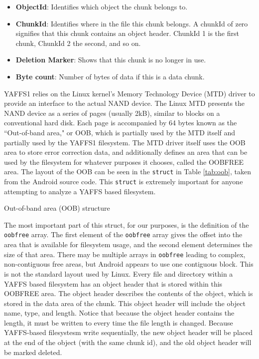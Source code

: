 \begin{itemize}
	\item {\bf ObjectId}: Identifies which object the chunk belongs to.\
	\item {\bf ChunkId}: Identifies where in the file this chunk belongs. 
		A chunkId of zero signifies that this chunk contains an object header. 
		ChunkId 1 is the first chunk, ChunkId 2 the second, and so on.
	\item {\bf Deletion Marker}: Shows that this chunk is no longer in use.
	\item {\bf Byte count}: Number of bytes of data if this is a data chunk.
\end{itemize}
\cite{howyaffsworks}

YAFFS1 relies on the Linux kernel's Memory Technology Device (MTD) driver to provide an interface to the actual NAND device.  The
Linux MTD presents the NAND device as a series of pages (usually 2kB), similar to blocks on a conventional hard disk.  Each page is
accompanied by 64 bytes known as the ``Out-of-band area," or OOB, which is partially used by the MTD itself and partially used by
the YAFFS1 filesystem. The MTD driver itself uses the OOB area to store error correction data, and additionally defines an area that
can be used by the filesystem for whatever purposes it chooses, called the OOBFREE area.  The layout of the OOB can be seen in the
\texttt{struct} in Table \ref{tab:oob}, taken from the Android source code. This \texttt{struct} is extremely important for anyone
attempting to analyze a YAFFS based filesystem.

\begin{table}[htpb]

\caption{Out-of-band area (OOB) structure}
\label{tab:oob}
\end{table}

The most important part of this struct, for our purposes, is the definition of the \texttt{oobfree} array.  The first element of the
\texttt{oobfree} array gives the offset into the area that is available for filesystem usage, and the second element determines the
size of that area.  There may be multiple arrays in \texttt{oobfree} leading to complex, non-contiguous free areas, but Android
appears to use one contiguous block.  This is not the standard layout used by Linux. Every file and directory within a YAFFS based
filesystem has an object header that is stored within this OOBFREE area. The object header describes the contents of the object,
which is stored in the data area of the chunk. This object header will include the object name, type, and length.  Notice that
because the object header contains the length, it must be written to every time the file length is changed.  Because YAFFS-based
filesystesm write sequentially, the new object header will be placed at the end of the object (with the same chunk id), and the old
object header will be marked deleted. 

